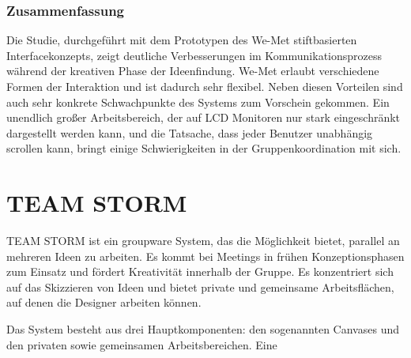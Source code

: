 \subsubsection{Zusammenfassung}
Die Studie, durchgeführt mit dem Prototypen des We-Met stiftbasierten Interfacekonzepts, zeigt deutliche Verbesserungen im Kommunikationsprozess während der kreativen Phase der Ideenfindung. We-Met erlaubt verschiedene Formen der Interaktion und ist dadurch sehr flexibel. Neben diesen Vorteilen sind auch sehr konkrete Schwachpunkte des Systems zum Vorschein gekommen. Ein unendlich großer Arbeitsbereich, der auf LCD Monitoren nur stark eingeschränkt dargestellt werden kann, und die Tatsache, dass jeder Benutzer unabhängig scrollen kann, bringt einige Schwierigkeiten in der Gruppenkoordination mit sich.


\section{TEAM STORM}
TEAM STORM ist ein groupware System, das die Möglichkeit bietet, parallel an mehreren Ideen zu arbeiten. Es kommt bei Meetings in frühen Konzeptionsphasen zum Einsatz und fördert Kreativität innerhalb der Gruppe. Es konzentriert sich auf das Skizzieren von Ideen und bietet private und gemeinsame Arbeitsflächen, auf denen die Designer arbeiten können.

Das System besteht aus drei Hauptkomponenten: den sogenannten Canvases und den privaten sowie gemeinsamen Arbeitsbereichen. Eine 

